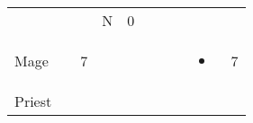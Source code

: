 \documentclass[12pt]{article}
\begin{document}
\begin{longtable}[]{@{}llllllllll@{}}
\begin{minipage}[t]{0.06\columnwidth}
\strut\end{minipage} &
\begin{minipage}[t]{0.06\columnwidth}\raggedright\strut
\strut\end{minipage} &
\begin{minipage}[t]{0.06\columnwidth}\raggedright\strut
\strut\end{minipage} &
\begin{minipage}[t]{0.07\columnwidth}\raggedright\strut
N
\strut\end{minipage} &
\begin{minipage}[t]{0.08\columnwidth}\raggedright\strut
0
\strut\end{minipage}\tabularnewline
\begin{minipage}[t]{0.13\columnwidth}\raggedright\strut
Mage
\strut\end{minipage} &
\begin{minipage}[t]{0.06\columnwidth}\raggedright\strut
\strut\end{minipage} &
\begin{minipage}[t]{0.06\columnwidth}\raggedright\strut
7
\strut\end{minipage} &
\begin{minipage}[t]{0.06\columnwidth}\raggedright\strut
\strut\end{minipage} &
\begin{minipage}[t]{0.06\columnwidth}\raggedright\strut
\strut\end{minipage} &
\begin{minipage}[t]{0.06\columnwidth}\raggedright\strut
\strut\end{minipage} &
\begin{minipage}[t]{0.06\columnwidth}\raggedright\strut
\strut\end{minipage} &
\begin{minipage}[t]{0.06\columnwidth}\raggedright\strut
\strut\end{minipage} &
\begin{minipage}[t]{0.07\columnwidth}\raggedright\strut
\begin{itemize}
\item
\end{itemize}
\strut\end{minipage} &
\begin{minipage}[t]{0.08\columnwidth}\raggedright\strut
7
\strut\end{minipage}\tabularnewline
\begin{minipage}[t]{0.13\columnwidth}\raggedright\strut
Priest
\strut\end{minipage} &

\end{longtable}
\end{document}

